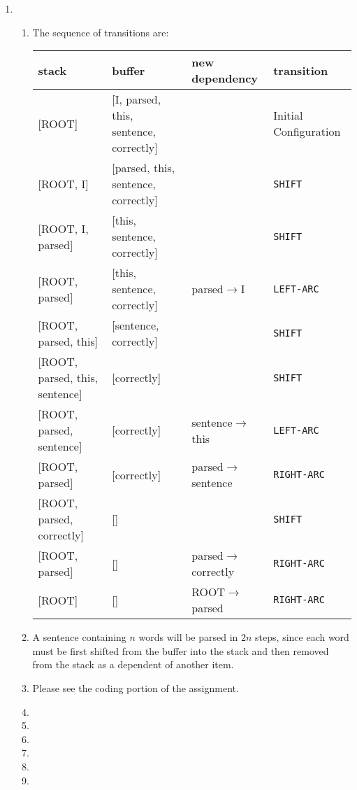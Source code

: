 \documentclass[10pt,reqno]{amsart}
\begin{document}
\begin{enumerate}[topsep=0pt,itemsep=3ex,partopsep=1ex,parsep=1ex]
\item
  \begin{enumerate}[itemsep=2ex]
  \item The sequence of transitions are:
    \vspace{1mm}
    \begin{center}
      \begin{tabular}{l|l|l|l}
        stack & buffer & new dependency & transition \\
        \hline
        {[ROOT]} & [I, parsed, this, sentence, correctly] &  & Initial Configuration \\
        {[ROOT, I]} & [parsed, this, sentence, correctly] &  & \texttt{SHIFT} \\
        {[ROOT, I, parsed]} & [this, sentence, correctly] &  & \texttt{SHIFT} \\
        {[ROOT, parsed]} & [this, sentence, correctly] & parsed$\to$I & \texttt{LEFT-ARC} \\
        {[ROOT, parsed, this]} & [sentence, correctly] &  & \texttt{SHIFT} \\
        {[ROOT, parsed, this, sentence]} & [correctly] &  & \texttt{SHIFT} \\
        {[ROOT, parsed, sentence]} & [correctly] & sentence$\to$this  & \texttt{LEFT-ARC} \\
        {[ROOT, parsed]} & [correctly] & parsed$\to$sentence  & \texttt{RIGHT-ARC} \\
        {[ROOT, parsed, correctly]} & [] &  & \texttt{SHIFT} \\
        {[ROOT, parsed]} & [] & parsed$\to$correctly & \texttt{RIGHT-ARC} \\
        {[ROOT]} & [] & ROOT$\to$parsed & \texttt{RIGHT-ARC} \\
      \end{tabular}
    \end{center}
    \vspace{1mm}
  \item A sentence containing $n$ words will be parsed in $2n$ steps,
    since each word must be first shifted from the buffer into the stack and
    then removed from the stack as a dependent of another item. 
  \item Please see the coding portion of the assignment.
  \item
  \item 
  \item 
  \item 
  \item 
  \item 
  \end{enumerate}



\end{enumerate}
\end{document}
